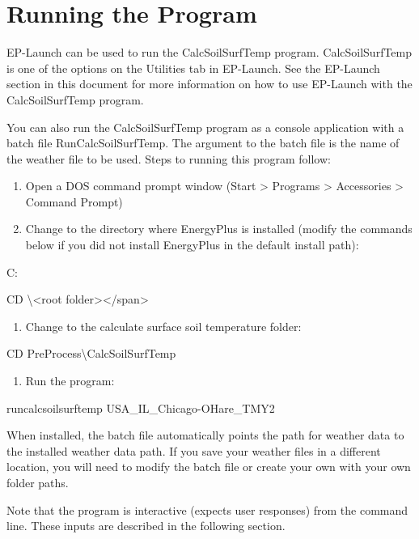 \section{Running the Program}\label{running-the-program}

EP-Launch can be used to run the CalcSoilSurfTemp program. CalcSoilSurfTemp is one of the options on the Utilities tab in EP-Launch. See the EP-Launch section in this document for more information on how to use EP-Launch with the CalcSoilSurfTemp program.

You can also run the CalcSoilSurfTemp program as a console application with a batch file RunCalcSoilSurfTemp. The argument to the batch file is the name of the weather file to be used. Steps to running this program follow:

\begin{enumerate}
\def\labelenumi{\arabic{enumi})}
\item
  Open a DOS command prompt window (Start > Programs > Accessories > Command Prompt)
\item
  Change to the directory where EnergyPlus is installed (modify the commands below if you did not install EnergyPlus in the default install path):
\end{enumerate}

C:

CD \textbackslash{}\textless{}root folder\textgreater{}\textless{}/span\textgreater{}

\begin{enumerate}
\def\labelenumi{\arabic{enumi})}
\setcounter{enumi}{2}
\tightlist
\item
  Change to the calculate surface soil temperature folder:
\end{enumerate}

CD PreProcess\textbackslash{}CalcSoilSurfTemp

\begin{enumerate}
\def\labelenumi{\arabic{enumi})}
\setcounter{enumi}{3}
\tightlist
\item
  Run the program:
\end{enumerate}

runcalcsoilsurftemp USA\_IL\_Chicago-OHare\_TMY2

When installed, the batch file automatically points the path for weather data to the installed weather data path. If you save your weather files in a different location, you will need to modify the batch file or create your own with your own folder paths.

Note that the program is interactive (expects user responses) from the command line. These inputs are described in the following section.
